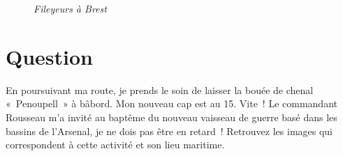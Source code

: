 \documentclass[12pt, report]{article}
\begin{document}
\begin{center}
\begin{figure}[ht]
\caption{\textit{Fileyeurs à Brest}}
\end{figure}
\end{center}

\section{Question}
En poursuivant ma route, je prends le soin de laisser la bouée de chenal « Penoupell » à bâbord. Mon nouveau cap est au 15. Vite ! Le commandant Rousseau m’a invité au baptême du nouveau vaisseau de guerre basé dans les bassins de l’Arsenal, je ne dois pas être en retard ! Retrouvez les images qui correspondent à cette activité et son lieu maritime.
\end{document}
